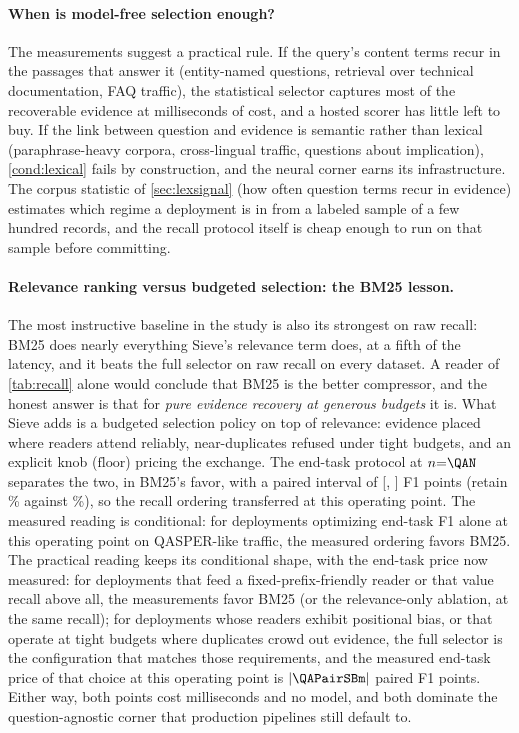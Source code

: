 \documentclass[pdflatex,sn-basic]{sn-jnl}
\DeclarePairedDelimiter\abs{\lvert}{\rvert}
\theoremstyle{remark}
\newcommand{\method}{Sieve}
\begin{document}
\paragraph{When is model-free selection enough?}
The measurements suggest a practical rule. If the query's content
terms recur in the passages that answer it (entity-named questions,
retrieval over technical documentation, FAQ traffic), the statistical
selector captures most of the recoverable evidence at milliseconds of
cost, and a hosted scorer has little left to buy. If the link between
question and evidence is semantic rather than lexical
(paraphrase-heavy corpora, cross-lingual traffic, questions about
implication), \autoref{cond:lexical} fails by construction, and the
neural corner earns its infrastructure. The corpus statistic of
\autoref{sec:lexsignal} (how often question terms recur in evidence)
estimates which regime a deployment is in from a labeled sample of a
few hundred records, and the recall protocol itself is cheap enough
to run on that sample before committing.

\paragraph{Relevance ranking versus budgeted selection: the BM25
lesson.}
The most instructive baseline in the study is also its strongest on
raw recall: BM25
does nearly everything \method{}'s relevance term does, at a fifth of
the latency, and it beats the full selector on raw recall on every
dataset. A reader of \autoref{tab:recall} alone would conclude that
BM25 is the better compressor, and the honest answer is that for
\emph{pure evidence recovery at generous budgets} it is. What
\method{} adds is a budgeted selection policy on top of relevance:
evidence placed where readers attend reliably, near-duplicates
refused under tight budgets, and an explicit knob
($\mathrm{floor}$) pricing the exchange. The end-task protocol at
$n{=}\QAN$ separates the two, in BM25's favor, with a paired interval
of [\QAPairSBmLo, \QAPairSBmHi] F1 points (retain \QABmRetain\% against
\QASieRetain\%), so the recall ordering transferred at this operating
point. The measured reading is conditional: for deployments
optimizing end-task F1 alone at this operating point on
QASPER-like traffic, the measured ordering favors BM25. The
practical reading keeps its conditional shape, with the end-task price
now measured: for deployments that feed a
fixed-prefix-friendly reader or that value
recall above all, the measurements favor BM25 (or the relevance-only
ablation, at
the same recall); for deployments whose readers exhibit positional
bias,
or that operate at tight budgets where duplicates crowd out evidence,
the full selector is the configuration that matches those
requirements, and the measured end-task price of that choice at this
operating point is $\abs{\QAPairSBm}$ paired F1
points. Either way, both points cost
milliseconds and no model, and both dominate the question-agnostic
corner that production pipelines still default to.
\end{document}
